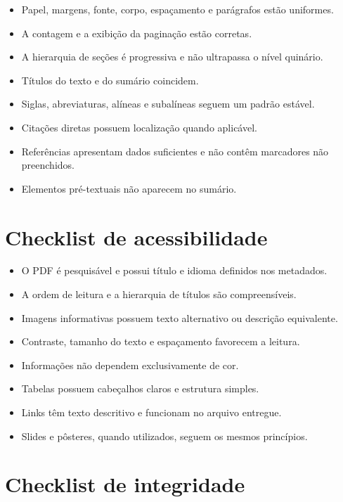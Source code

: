 \begin{itemize}
  \item Papel, margens, fonte, corpo, espaçamento e parágrafos estão uniformes.
  \item A contagem e a exibição da paginação estão corretas.
  \item A hierarquia de seções é progressiva e não ultrapassa o nível quinário.
  \item Títulos do texto e do sumário coincidem.
  \item Siglas, abreviaturas, alíneas e subalíneas seguem um padrão estável.
  \item Citações diretas possuem localização quando aplicável.
  \item Referências apresentam dados suficientes e não contêm marcadores não preenchidos.
  \item Elementos pré-textuais não aparecem no sumário.
\end{itemize}

\section{Checklist de acessibilidade}

\begin{itemize}
  \item O PDF é pesquisável e possui título e idioma definidos nos metadados.
  \item A ordem de leitura e a hierarquia de títulos são compreensíveis.
  \item Imagens informativas possuem texto alternativo ou descrição equivalente.
  \item Contraste, tamanho do texto e espaçamento favorecem a leitura.
  \item Informações não dependem exclusivamente de cor.
  \item Tabelas possuem cabeçalhos claros e estrutura simples.
  \item Links têm texto descritivo e funcionam no arquivo entregue.
  \item Slides e pôsteres, quando utilizados, seguem os mesmos princípios.
\end{itemize}

\section{Checklist de integridade}

